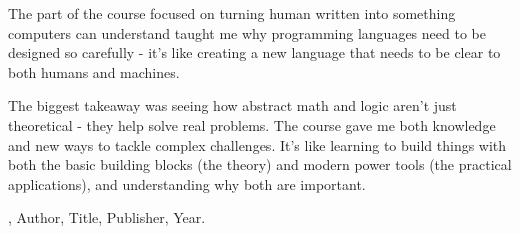 \documentclass{article}
\theoremstyle{theorem}
\theoremstyle{definition}
\theoremstyle{remark}
\begin{document}
The part of the course focused on turning human written into something computers can understand taught me why programming languages 
need to be designed so carefully - it's like creating a new language that needs to be clear to both humans and machines.

The biggest takeaway was seeing how abstract math and logic aren't just theoretical - they help solve real problems. 
The course gave me both knowledge and new ways to tackle complex challenges. It's like learning to build things with both the basic 
building blocks (the theory) and modern power tools (the practical applications), and understanding why both are important.


\begin{thebibliography}{99}
\bibitem[BLA], Author, Title, Publisher, Year.
\end{thebibliography}
\end{document}
